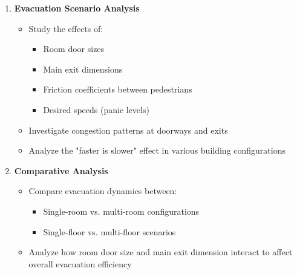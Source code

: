 \begin{enumerate}
	\item \textbf{Evacuation Scenario Analysis}
	      \begin{itemize}
		      \item Study the effects of:
		            \begin{itemize}
			            \item Room door sizes
			            \item Main exit dimensions
			            \item Friction coefficients between pedestrians
			            \item Desired speeds (panic levels)
		            \end{itemize}
		      \item Investigate congestion patterns at doorways and exits
		      \item Analyze the "faster is slower" effect in various building configurations
	      \end{itemize}

	\item \textbf{Comparative Analysis}
	      \begin{itemize}
		      \item Compare evacuation dynamics between:
		            \begin{itemize}
			            \item Single-room vs. multi-room configurations
			            \item Single-floor vs. multi-floor scenarios
		            \end{itemize}
		      \item Analyze how room door size and main exit dimension interact to affect overall evacuation efficiency
	      \end{itemize}
\end{enumerate}
